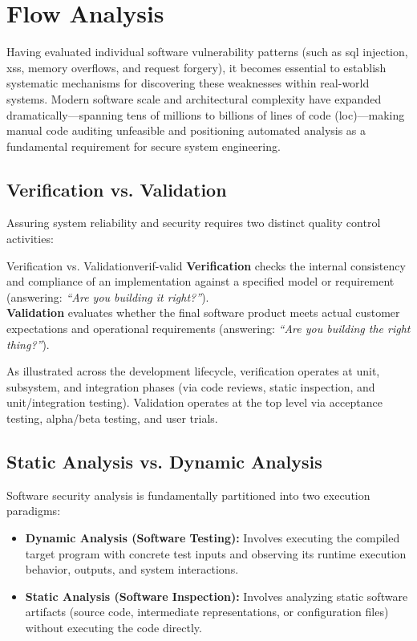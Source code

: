 \chapter{Flow Analysis}
\label{ch:flow_analysis}

Having evaluated individual software vulnerability patterns (such as \gls{sql} injection, \gls{xss}, memory overflows, and request forgery), it becomes essential to establish systematic mechanisms for discovering these weaknesses within real-world systems. Modern software scale and architectural complexity have expanded dramatically—spanning tens of millions to billions of lines of code (\gls{loc})—making manual code auditing unfeasible and positioning automated analysis as a fundamental requirement for secure system engineering.

\section{Verification vs. Validation}

Assuring system reliability and security requires two distinct quality control activities:

\begin{definition}{Verification vs. Validation}{verif-valid}
    \textbf{Verification} checks the internal consistency and compliance of an implementation against a specified model or requirement (answering: \textit{``Are you building it right?''}). \\
    \textbf{Validation} evaluates whether the final software product meets actual customer expectations and operational requirements (answering: \textit{``Are you building the right thing?''}).
\end{definition}

As illustrated across the development lifecycle, verification operates at unit, subsystem, and integration phases (via code reviews, static inspection, and unit/integration testing). Validation operates at the top level via acceptance testing, alpha/beta testing, and user trials.

\section{Static Analysis vs. Dynamic Analysis}

Software security analysis is fundamentally partitioned into two execution paradigms:

\begin{itemize}
    \item \textbf{Dynamic Analysis (Software Testing):} Involves executing the compiled target program with concrete test inputs and observing its runtime execution behavior, outputs, and system interactions.
    \item \textbf{Static Analysis (Software Inspection):} Involves analyzing static software artifacts (source code, intermediate representations, or configuration files) without executing the code directly.
\end{itemize}

